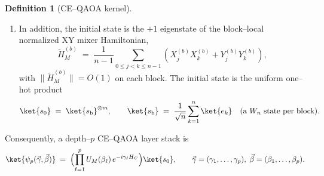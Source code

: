 \documentclass[a4paper,unpublished,onecolumn,11pt]{quantumarticle}
\theoremstyle{definition}
\newtheorem{definition}[theorem]{Definition}
\theoremstyle{remark}
\begin{document}
\begin{definition}[CE--QAOA kernel]
\begin{enumerate}[label=\textup{(\alph*)}, leftmargin=2.2em]
      A sufficient penalty condition is
      \[
      \min_{z\notin\mathcal F}H_{\mathrm{pen}}(z)
      >
      \max_{z\in\mathcal H_{\mathrm{OH}}}H_{\mathrm{obj}}(z)
      -
      \min_{z\in\mathcal H_{\mathrm{OH}}}H_{\mathrm{obj}}(z).
      \]
\item In addition, the initial state is the $+1$ eigenstate of the block–local normalized XY mixer Hamiltonian,
      \[
      \widetilde H_{M}^{(b)} \;=\;
      \frac{1}{n-1}\sum_{0\le j<k\le n-1}(X_j^{(b)}X_k^{(b)}+Y_j^{(b)}Y_k^{(b)}),
      \]
      with $\|\widetilde H_{M}^{(b)}\|=O(1)$ on each block. The initial state is the       uniform one–hot product
      \[
      \ket{s_0}\;=\;\ket{s_{\mathrm{b}}}^{\otimes m},
      \qquad
      \ket{s_{\mathrm{b}}}\;=\;\frac{1}{\sqrt n}\sum_{k=1}^{n} \ket{e_k}
      \quad\text{(a $W_n$ state per block)}.
      \]
\end{enumerate}
\end{definition}

Consequently, a depth–$p$ CE–QAOA layer stack is
\[
  \ket{\psi_p(\vec\gamma,\vec\beta)}
  \;=\;
  \Bigl(\prod_{\ell=1}^{p} U_M(\beta_\ell)\,e^{-i\gamma_\ell H_C}\Bigr)\ket{s_0},
  \qquad
  \vec\gamma=(\gamma_1,\dots,\gamma_p),\;
  \vec\beta=(\beta_1,\dots,\beta_p).
\]
\end{document}

